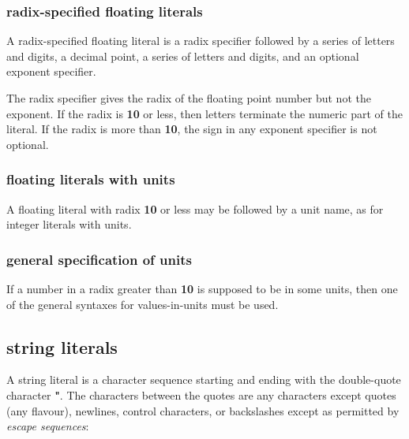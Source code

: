 \documentclass{report}
\begin{document}
\subsubsection{radix-specified floating literals}


A radix-specified floating literal is a radix specifier followed by a series
of letters and digits, a decimal point, a series of letters and digits, and an
optional exponent specifier.

The radix specifier gives the radix of the floating point number but not the
exponent. If the radix is {\bf 10} or less, then letters terminate the numeric
part of the literal. If the radix is more than {\bf 10}, the sign in any exponent
specifier is not optional.

\subsubsection{floating literals with units}


A floating literal with radix {\bf 10} or less may be followed by a unit name, as
for integer literals with units.

\subsubsection{general specification of units}


If a number in a radix greater than {\bf 10} is supposed to be in some units,
then one of the general syntaxes for values-in-units must be used.

\subsection{string literals}


A string literal is a character sequence starting and ending with the
double-quote character {\bf "}. The characters between the quotes are any
characters except quotes (any flavour), newlines, control characters, or
backslashes except as permitted by {\em escape sequences}:
\end{document}
